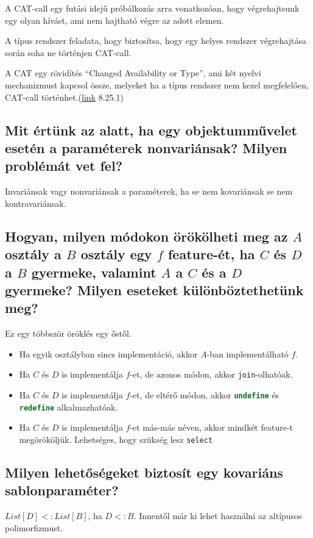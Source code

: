 	A CAT-call egy futási idejű próbálkozás arra vonatkozóan, hogy végrehajtsunk egy olyan hívást, ami nem hajtható végre az adott elemen.
	
	A típus rendszer feladata, hogy biztosítsa, hogy egy helyes rendszer végrehajtása során soha ne történjen CAT-call.
	
	A CAT egy rövidítés “Changed Availability or Type”, ami két nyelvi mechanizmust kapcsol össze, melyeket ha a típus rendszer nem kezel megfelelően, CAT-call történhet.(\href{http://www.ecma-international.org/publications/files/ECMA-ST/ECMA-367.pdf}{link} 8.25.1)
	
\subsection{ Mit értünk az alatt, ha egy objektumművelet esetén a paraméterek nonvariánsak? Milyen problémát vet fel? }
	Invariánsak vagy nonvariánsak a paraméterek, ha se nem kovariánsak se nem kontravariánsak.	
	
\subsection{ Hogyan, milyen módokon örökölheti meg az $A$ osztály a $B$ osztály egy $f$ feature-ét, ha $C$ és $D$ a $B$ gyermeke, valamint $A$ a $C$ és a $D$ gyermeke? Milyen eseteket különböztethetünk meg? }

	Ez egy többször öröklés egy őstől.
	
	\begin{itemize}
		\item Ha egyik osztályban sincs implementáció, akkor $A$-ban implementálható $f$.
		\item Ha $C$ és $D$ is implementálja $f$-et, de azonos módon, akkor \lstinline[language=Eiffel]|join|-olhatóak.
		\item Ha $C$ és $D$ is implementálja $f$-et, de eltérő módon, akkor \lstinline[language=Eiffel]|undefine| és \lstinline[language=Eiffel]|redefine| alkalmazhatóak.
		\item Ha $C$ és $D$ is implementálja $f$-et más-más néven, akkor mindkét feature-t megörököljük. Lehetséges, hogy szükség lesz \lstinline[language=Eiffel]|select|
	\end{itemize}
	
\subsection{ Milyen lehetőségeket biztosít egy kovariáns sablonparaméter? }
	$List[D] <: List[B]$, ha $D<:B$. Innentől már ki lehet használni az altípusos polimorfizmust.
	
